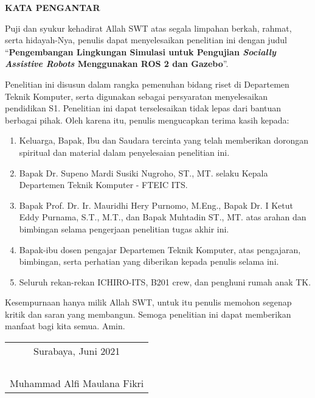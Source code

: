 \begin{center}
  \Large
  \textbf{KATA PENGANTAR}
\end{center}

\vspace{2ex}

Puji dan syukur kehadirat Allah SWT atas segala limpahan berkah, rahmat, serta hidayah-Nya, penulis  dapat menyelesaikan penelitian ini dengan judul
``\textbf{Pengembangan Lingkungan Simulasi untuk Pengujian \emph{Socially Assistive Robots} Menggunakan ROS 2 dan Gazebo}''.

Penelitian ini disusun dalam rangka pemenuhan bidang riset di Departemen Teknik Komputer, serta digunakan sebagai persyaratan menyelesaikan pendidikan  S1.
Penelitian ini dapat terselesaikan tidak lepas dari bantuan berbagai pihak.
Oleh karena itu, penulis mengucapkan terima kasih kepada:

\begin{enumerate}[nolistsep]

  \item Keluarga, Bapak, Ibu dan Saudara tercinta yang telah memberikan dorongan spiritual dan material dalam penyelesaian penelitian ini.

  \item Bapak Dr. Supeno Mardi Susiki Nugroho, ST., MT. selaku Kepala Departemen Teknik Komputer - FTEIC ITS.

  \item Bapak Prof. Dr. Ir. Mauridhi Hery Purnomo, M.Eng., Bapak Dr. I Ketut Eddy Purnama, S.T., M.T., dan Bapak Muhtadin ST., MT. atas arahan dan bimbingan selama pengerjaan penelitian tugas akhir ini.

  \item Bapak-ibu dosen pengajar Departemen Teknik Komputer, atas pengajaran,  bimbingan, serta perhatian yang diberikan kepada penulis selama ini.

  \item Seluruh rekan-rekan ICHIRO-ITS, B201 crew, dan penghuni rumah anak TK.

\end{enumerate}

Kesempurnaan hanya milik Allah SWT, untuk itu penulis memohon segenap kritik dan saran yang  membangun.
Semoga penelitian ini dapat memberikan manfaat bagi kita semua.
Amin.

\begin{flushright}
  \begin{tabular}[b]{c}
    Surabaya, Juni 2021\\
    \\
    \\
    \\
    \\
    Muhammad Alfi Maulana Fikri
  \end{tabular}
\end{flushright}
